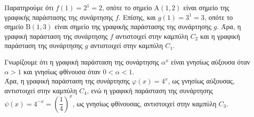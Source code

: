 \documentclass[11pt,a4paper,twoside]{book}
\begin{document}
\begin{alist}
\item Παρατηρούμε ότι $f(1) = 2^1 = 2$, οπότε το σημείο $\text{A}(1,2)$ είναι σημείο της γραφικής παράστασης της συνάρτησης $f$. Επίσης, και $g(1) = 3^1 = 3$, οπότε το σημείο $\text{B}(1,3)$ είναι σημείο της γραφικής παράστασης της συνάρτησης $g$. Άρα, η γραφική παράσταση της συνάρτησης $f$ αντιστοιχεί στην καμπύλη $C_2$ και η γραφική παράσταση της συνάρτησης $g$ αντιστοιχεί στην καμπύλη $C_1$.
\begin{center}
\end{center}
\item Γνωρίζουμε ότι η γραφική παράσταση της συνάρτησης $\alpha^x$ είναι γνησίως αύξουσα όταν $\alpha > 1$ και γνησίως φθίνουσα όταν $0 < \alpha < 1$. \\
Άρα, η γραφική παράσταση της συνάρτησης $\varphi(x) = 4^x$, ως γνησίως αύξουσας, αντιστοιχεί στην καμπύλη $C_4$, ενώ η γραφική παράσταση της συνάρτησης $\psi(x) = 4^{-x} = \left(\dfrac{1}{4}\right)^x$, ως γνησίως φθίνουσας, αντιστοιχεί στην καμπύλη $C_3$.
\begin{center}
\end{center}
\end{alist}
\end{document}

